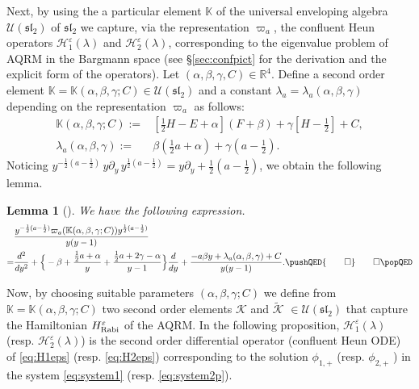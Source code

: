 \documentclass[11pt]{article}
\numberwithin{equation}{section}
\newcommand{\R}{\mathbb{R}} %
\newcommand{\e}{\varepsilon}
\newcommand{\HRabi}[1]{H_{\text{\upshape Rabi}}^{#1}} %
\newcommand{\QEDhere}{\pushQED{\qed}\qedhere\popQED}
\theoremstyle{plain}
\newtheorem{lem}[thm]{Lemma}
\theoremstyle{definition}
\theoremstyle{remark}
\begin{document}
Next, by using the a particular element \(\mathbb{K} \) of the universal enveloping algebra \(\mathcal{U}(\mathfrak{sl}_2)\) of \(\mathfrak{sl}_2\) we capture, via the representation \(\varpi_a\), the confluent Heun operators \(\mathcal{H}_1^{\e}(\lambda) \) and \(\mathcal{H}_2^{\e}(\lambda) \), corresponding to the eigenvalue problem of AQRM in the Bargmann space (see \S \ref{sec:confpict} for the derivation and the explicit form of the operators). Let  $(\alpha, \beta, \gamma, C) \in \R^4$.  Define a second order element ${\mathbb{K}}=\mathbb{K}(\alpha, \beta, \gamma; C) \in \mathcal{U}(\mathfrak{sl}_{2})$ and a constant $\lambda_a=\lambda_a(\alpha, \beta, \gamma)$ depending on the representation $\varpi_a$ as follows:
\begin{align*}
  \mathbb{K}(\alpha, \beta, \gamma; C):= & \left[\frac{1}{2}H-E+\alpha \right]\left(F+\beta\right)
                                           + \gamma\left[H-\frac{1}{2}\right]+C,\\
  \lambda_a(\alpha, \beta, \gamma):= & \beta\left(\frac{1}{2}a +\alpha\right)+\gamma\left(a-\frac{1}{2}\right).
\end{align*}
Noticing $y^{-\frac12(a-\frac12)}\,y\partial_y \,y^{\frac12(a-\frac12)}= y\partial_y+ \frac12(a-\frac12)$, we
obtain the following lemma.
\begin{lem}[\cite{W2016JPA,WY2014JPA}]\label{lem:K-element}
  We have the following expression.
  \begin{align*}
    &\frac{y^{-\frac12(a-\frac12)}\varpi_a(\mathbb{K}(\alpha, \beta, \gamma; C))y^{\frac12(a-\frac12)}}{y(y-1)}\\
    = &\frac{d^2}{dy^2} +\Big\{-\beta + \frac{\frac12a+\alpha}{y} + \frac{\frac12a+2\gamma-\alpha}{y-1} \Big\}\frac{d}{d y}
        +  \frac{-a\beta y+\lambda_a(\alpha, \beta, \gamma)+C}{y(y-1)}. \QEDhere
  \end{align*}
\end{lem}

Now, by choosing suitable parameters $(\alpha, \beta, \gamma; C)$ we define
from ${\mathbb{K}}=\mathbb{K}(\alpha, \beta, \gamma; C)$ two second order elements $\mathcal{K}$ and
$\tilde{\mathcal{K}}$ $\in \mathcal{U}(\mathfrak{sl}_2)$ that capture the Hamiltonian \(\HRabi{\e} \)
of the AQRM. In the following proposition, \(\mathcal{H}_1^{\e}(\lambda)\) (resp. \( \mathcal{H}_2^{\e}(\lambda)\)) is the second order differential operator (confluent Heun ODE) of \eqref{eq:H1eps} (resp. \eqref{eq:H2eps}) corresponding to the solution \( \phi_{1,+}\) (resp. \( \phi_{2,+}\) ) in the system \eqref{eq:system1} (resp. \eqref{eq:system2p}).
\end{document}
